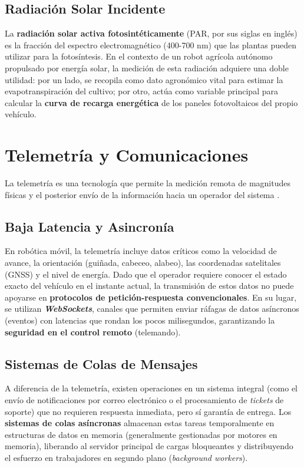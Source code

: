 
\subsection{Radiación Solar Incidente}
La \textbf{radiación solar activa fotosintéticamente} (PAR, por sus siglas en inglés) es la fracción del espectro electromagnético (400-700 nm) que las plantas pueden utilizar para la fotosíntesis. En el contexto de un robot agrícola autónomo propulsado por energía solar, la medición de esta radiación adquiere una doble utilidad: por un lado, se recopila como dato agronómico vital para estimar la evapotranspiración del cultivo; por otro, actúa como variable principal para calcular la \textbf{curva de recarga energética} de los paneles fotovoltaicos del propio vehículo.

\section{Telemetría y Comunicaciones}

La telemetría es una tecnología que permite la medición remota de magnitudes físicas y el posterior envío de la información hacia un operador del sistema \cite{telemetria}.

\subsection{Baja Latencia y Asincronía}
En robótica móvil, la telemetría incluye datos críticos como la velocidad de avance, la orientación (guiñada, cabeceo, alabeo), las coordenadas satelitales (GNSS) y el nivel de energía. Dado que el operador requiere conocer el estado exacto del vehículo en el instante actual, la transmisión de estos datos no puede apoyarse en \textbf{protocolos de petición-respuesta convencionales}. En su lugar, se utilizan \textbf{\textit{WebSockets}}, canales que permiten enviar ráfagas de datos asíncronos (eventos) con latencias que rondan los pocos milisegundos, garantizando la \textbf{seguridad en el control remoto} (telemando).

\subsection{Sistemas de Colas de Mensajes}
A diferencia de la telemetría, existen operaciones en un sistema integral (como el envío de notificaciones por correo electrónico o el procesamiento de \textit{tickets} de soporte) que no requieren respuesta inmediata, pero sí garantía de entrega. Los \textbf{sistemas de colas asíncronas} almacenan estas tareas temporalmente en estructuras de datos en memoria (generalmente gestionadas por motores en memoria), liberando al servidor principal de cargas bloqueantes y distribuyendo el esfuerzo en trabajadores en segundo plano (\textit{background workers}).


